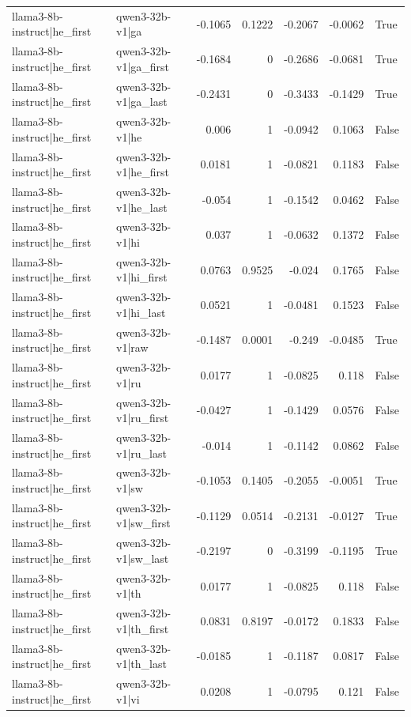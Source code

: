 \begin{table}
\begin{tabular}{l l r r r r l}
llama3-8b-instruct|he_first & qwen3-32b-v1|ga & -0.1065 & 0.1222 & -0.2067 & -0.0062 & True \\
llama3-8b-instruct|he_first & qwen3-32b-v1|ga_first & -0.1684 & 0 & -0.2686 & -0.0681 & True \\
llama3-8b-instruct|he_first & qwen3-32b-v1|ga_last & -0.2431 & 0 & -0.3433 & -0.1429 & True \\
llama3-8b-instruct|he_first & qwen3-32b-v1|he & 0.006 & 1 & -0.0942 & 0.1063 & False \\
llama3-8b-instruct|he_first & qwen3-32b-v1|he_first & 0.0181 & 1 & -0.0821 & 0.1183 & False \\
llama3-8b-instruct|he_first & qwen3-32b-v1|he_last & -0.054 & 1 & -0.1542 & 0.0462 & False \\
llama3-8b-instruct|he_first & qwen3-32b-v1|hi & 0.037 & 1 & -0.0632 & 0.1372 & False \\
llama3-8b-instruct|he_first & qwen3-32b-v1|hi_first & 0.0763 & 0.9525 & -0.024 & 0.1765 & False \\
llama3-8b-instruct|he_first & qwen3-32b-v1|hi_last & 0.0521 & 1 & -0.0481 & 0.1523 & False \\
llama3-8b-instruct|he_first & qwen3-32b-v1|raw & -0.1487 & 0.0001 & -0.249 & -0.0485 & True \\
llama3-8b-instruct|he_first & qwen3-32b-v1|ru & 0.0177 & 1 & -0.0825 & 0.118 & False \\
llama3-8b-instruct|he_first & qwen3-32b-v1|ru_first & -0.0427 & 1 & -0.1429 & 0.0576 & False \\
llama3-8b-instruct|he_first & qwen3-32b-v1|ru_last & -0.014 & 1 & -0.1142 & 0.0862 & False \\
llama3-8b-instruct|he_first & qwen3-32b-v1|sw & -0.1053 & 0.1405 & -0.2055 & -0.0051 & True \\
llama3-8b-instruct|he_first & qwen3-32b-v1|sw_first & -0.1129 & 0.0514 & -0.2131 & -0.0127 & True \\
llama3-8b-instruct|he_first & qwen3-32b-v1|sw_last & -0.2197 & 0 & -0.3199 & -0.1195 & True \\
llama3-8b-instruct|he_first & qwen3-32b-v1|th & 0.0177 & 1 & -0.0825 & 0.118 & False \\
llama3-8b-instruct|he_first & qwen3-32b-v1|th_first & 0.0831 & 0.8197 & -0.0172 & 0.1833 & False \\
llama3-8b-instruct|he_first & qwen3-32b-v1|th_last & -0.0185 & 1 & -0.1187 & 0.0817 & False \\
llama3-8b-instruct|he_first & qwen3-32b-v1|vi & 0.0208 & 1 & -0.0795 & 0.121 & False \\

\end{tabular}
\end{table}
